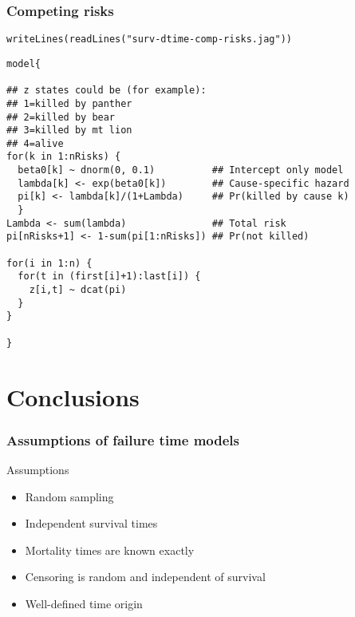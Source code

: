\documentclass[color=usenames,dvipsnames]{beamer}\usepackage[]{graphicx}\usepackage[]{color}
\makeatletter
\newcommand{\hlstr}[1]{\textcolor[rgb]{0.749,0.012,0.012}{#1}}%
\newcommand{\hlstd}[1]{\textcolor[rgb]{0,0,0}{#1}}%
\newcommand{\hlkwd}[1]{\textcolor[rgb]{0.004,0.004,0.506}{#1}}%
\newenvironment{kframe}{%
 \def\at@end@of@kframe{}%
 \ifinner\ifhmode%
  \def\at@end@of@kframe{\end{minipage}}%
  \begin{minipage}{\columnwidth}%
 \fi\fi%
 \def\FrameCommand##1{\hskip\@totalleftmargin \hskip-\fboxsep
 \colorbox{shadecolor}{##1}\hskip-\fboxsep
     \hskip-\linewidth \hskip-\@totalleftmargin \hskip\columnwidth}%
 \MakeFramed {\advance\hsize-\width
   \@totalleftmargin\z@ \linewidth\hsize
   \@setminipage}}%
 {\par\unskip\endMakeFramed%
 \at@end@of@kframe}
\newenvironment{knitrout}{}{} %
\makeatother
\begin{document}
\begin{frame}[fragile]
  \frametitle{Competing risks}
\begin{knitrout}\scriptsize
{}\color{fgcolor}\begin{kframe}
\begin{alltt}
\hlkwd{writeLines}\hlstd{(}\hlkwd{readLines}\hlstd{(}\hlstr{"surv-dtime-comp-risks.jag"}\hlstd{))}
\end{alltt}
\end{kframe}
\end{knitrout}
\vspace{-6pt}
\begin{knitrout}\scriptsize
{}\color{fgcolor}\begin{kframe}
\begin{verbatim}
model{

## z states could be (for example):
## 1=killed by panther
## 2=killed by bear
## 3=killed by mt lion
## 4=alive
for(k in 1:nRisks) {
  beta0[k] ~ dnorm(0, 0.1)          ## Intercept only model
  lambda[k] <- exp(beta0[k])        ## Cause-specific hazard
  pi[k] <- lambda[k]/(1+Lambda)     ## Pr(killed by cause k)
  }
Lambda <- sum(lambda)               ## Total risk
pi[nRisks+1] <- 1-sum(pi[1:nRisks]) ## Pr(not killed) 

for(i in 1:n) {
  for(t in (first[i]+1):last[i]) {
    z[i,t] ~ dcat(pi)
  }
}

}
\end{verbatim}
\end{kframe}
\end{knitrout}
\end{frame}



\section{Conclusions}




\begin{frame}
  \frametitle{Assumptions of failure time models}
  Assumptions
  \begin{itemize}
    \item Random sampling
    \item Independent survival times
    \item Mortality times are known exactly
    \item Censoring is random and independent of survival
    \item Well-defined time origin
  \end{itemize}
\end{frame}
\end{document}
